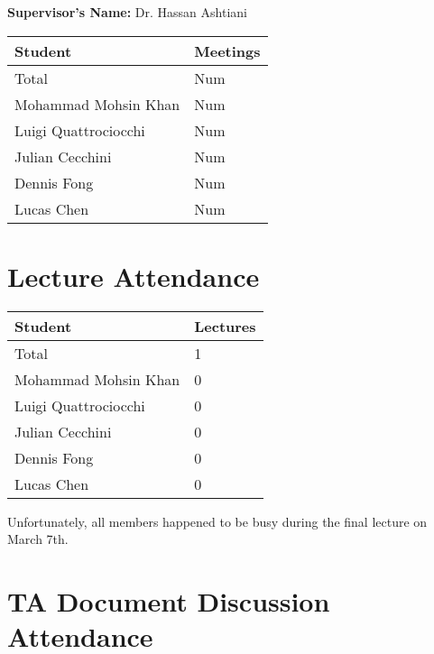 \documentclass{article}
\begin{document}
\noindent \textbf{Supervisor's Name: } Dr. Hassan Ashtiani

\begin{table}[H]
\centering
\begin{tabular}{ll}
\toprule
\textbf{Student} & \textbf{Meetings}\\
\midrule
Total & Num\\
Mohammad Mohsin Khan & Num\\
Luigi Quattrociocchi & Num\\
Julian Cecchini & Num\\
Dennis Fong & Num\\
Lucas Chen & Num\\
\bottomrule
\end{tabular}
\end{table}


\section{Lecture Attendance}


\begin{table}[H]
\centering
\begin{tabular}{ll}
\toprule
\textbf{Student} & \textbf{Lectures}\\
\midrule
Total & 1\\
Mohammad Mohsin Khan & 0\\
Luigi Quattrociocchi & 0\\
Julian Cecchini & 0\\
Dennis Fong & 0\\
Lucas Chen & 0\\
\bottomrule
\end{tabular}
\end{table}

Unfortunately, all members happened to be busy during the final lecture on March 7th.

\section{TA Document Discussion Attendance}
\end{document}
